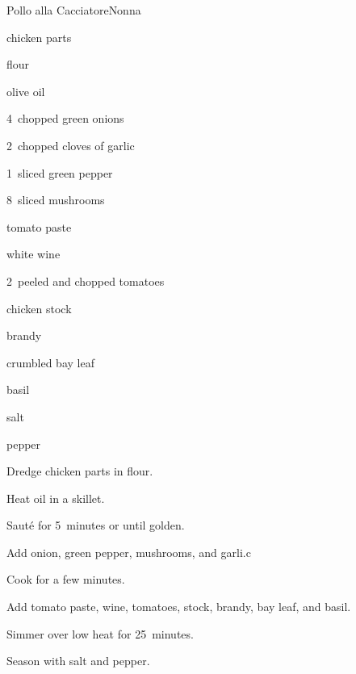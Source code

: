 \begin{recipe}{Pollo alla Cacciatore}{Nonna}{}

\begin{ingredients}
\item {} chicken parts
\item \C{\half} flour
\item {} olive oil
\item 4~chopped green onions
\item 2~chopped cloves of garlic
\item 1~sliced green pepper
\item 8~sliced mushrooms
\item {} tomato paste
\item \C{\half} white wine
\item 2~peeled and chopped tomatoes
\item \C{\threequarter} chicken stock
\item \C{\quarter} brandy
\item crumbled bay leaf
\item basil
\item salt
\item pepper
\end{ingredients}

\begin{directions}
\item Dredge chicken parts in flour.
\item Heat oil in a skillet.
\item Saut\'e for 5~minutes or until golden.
\item Add onion, green pepper, mushrooms, and garli.c
\item Cook for a few minutes.
\item Add tomato paste, wine, tomatoes, stock, brandy, bay leaf, and basil.
\item Simmer over low heat for 25~minutes.
\item Season with salt and pepper.
\end{directions}

\end{recipe}
